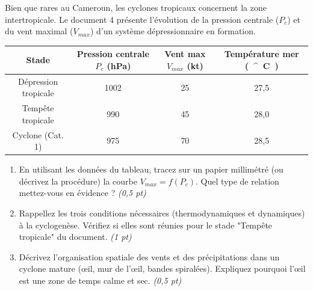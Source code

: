 \documentclass[11pt]{article}
\providecommand{\degree}{^{\circ}}
\begin{document}
\begin{exercice}
\label{exo:cyclone}
Bien que rares au Cameroun, les cyclones tropicaux concernent la zone intertropicale. Le document 4 présente l'évolution de la pression centrale ($P_c$) et du vent maximal ($V_{max}$) d'un système dépressionnaire en formation.

\begin{center}
\begin{tabular}{|c|c|c|c|}
\hline
\textbf{Stade} & \textbf{Pression centrale $P_c$ (hPa)} & \textbf{Vent max $V_{max}$ (kt)} & \textbf{Température mer (\SI{}{\degree}C)} \\ \hline
Dépression tropicale & 1002 & 25 & 27,5 \\ \hline
Tempête tropicale & 990 & 45 & 28,0 \\ \hline
Cyclone (Cat. 1) & 975 & 70 & 28,5 \\ \hline
\end{tabular}
\end{center}

\begin{enumerate}
    \item En utilisant les données du tableau, tracez sur un papier millimétré (ou décrivez la procédure) la courbe $V_{max} = f(P_c)$. Quel type de relation mettez-vous en évidence ? \textit{(0,5 pt)}
    \item Rappellez les trois conditions nécessaires (thermodynamiques et dynamiques) à la cyclogenèse. Vérifiez si elles sont réunies pour le stade "Tempête tropicale" du document. \textit{(1 pt)}
    \item Décrivez l'organisation spatiale des vents et des précipitations dans un cyclone mature (œil, mur de l'œil, bandes spiralées). Expliquez pourquoi l'œil est une zone de temps calme et sec. \textit{(0,5 pt)}
\end{enumerate}
\end{exercice}
\end{document}
